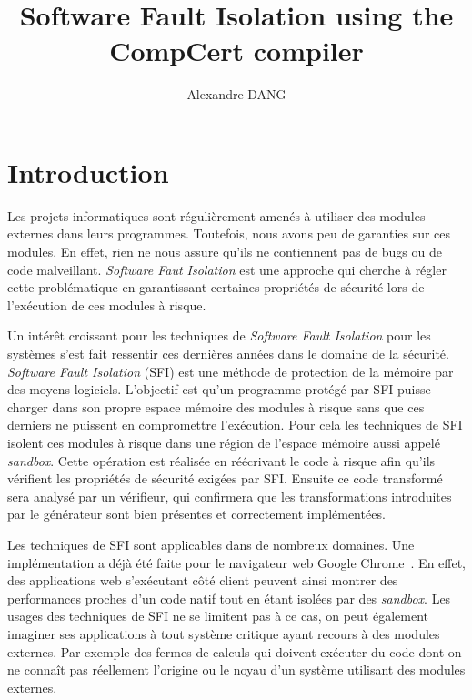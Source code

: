 \documentclass[11pt]{sdm}
\title{Software Fault Isolation using the CompCert compiler}
\author{Alexandre \textsc{DANG}}
\begin{document}
\maketitle


\section{Introduction}

Les projets informatiques sont régulièrement amenés à utiliser des modules externes dans leurs programmes. Toutefois, nous avons peu de garanties sur ces modules. En effet, rien ne nous assure qu'ils ne contiennent pas de bugs ou de code malveillant. \textit{Software Faut Isolation} est une approche qui cherche à régler cette problématique en garantissant certaines propriétés de sécurité lors de l'exécution de ces modules à risque.

Un intérêt croissant pour les techniques de \textit{Software Fault Isolation} pour les systèmes s'est fait ressentir ces dernières années dans le domaine de la sécurité. \textit{Software Fault Isolation} (SFI) est une méthode de protection de la mémoire par des moyens logiciels. L'objectif est qu'un programme protégé par SFI puisse charger dans son propre espace mémoire des modules à risque sans que ces derniers ne puissent en compromettre l'exécution. Pour cela les techniques de SFI isolent ces modules à risque dans une région de l'espace mémoire aussi appelé \textit{sandbox}. Cette opération est réalisée en réécrivant le code à risque afin qu'ils vérifient les propriétés de sécurité exigées par SFI. Ensuite ce code transformé sera analysé par un vérifieur, qui confirmera que les transformations introduites par le générateur sont bien présentes et correctement implémentées.

Les techniques de SFI sont applicables dans de nombreux domaines. Une implémentation a déjà été faite pour le navigateur web Google Chrome~\cite{Yee:2010:NCS:1629175.1629203}\cite{Sehr:2010:ASF:1929820.1929822}. En effet, des applications web s'exécutant côté client peuvent ainsi montrer des performances proches d'un code natif tout en étant isolées par des \textit{sandbox}. Les usages des techniques de SFI ne se limitent pas à ce cas, on peut également imaginer ses applications à tout système critique ayant recours à des modules externes. Par exemple des fermes de calculs qui doivent exécuter du code dont on ne connaît pas réellement l'origine ou le noyau d'un système utilisant des modules externes.
\end{document}
